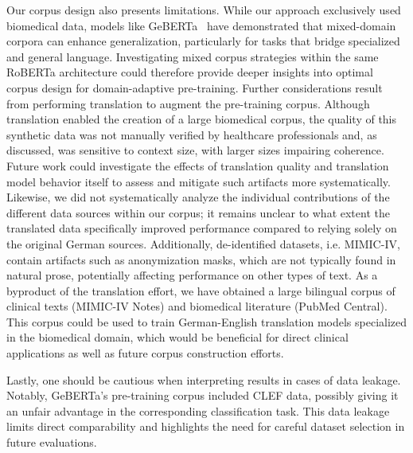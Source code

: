 Our corpus design also presents limitations. While our approach exclusively used
biomedical data, models like GeBERTa~\cite{dada2023impact} have demonstrated
that mixed-domain corpora can enhance generalization, particularly for tasks
that bridge specialized and general language. Investigating mixed corpus
strategies within the same RoBERTa architecture could therefore provide deeper
insights into optimal corpus design for domain-adaptive pre-training. Further
considerations result from performing translation to augment the pre-training
corpus. Although translation enabled the creation of a large biomedical corpus,
the quality of this synthetic data was not manually verified by healthcare
professionals and, as discussed, was sensitive to context size, with larger
sizes impairing coherence. Future work could investigate the effects of
translation quality and translation model behavior itself to assess and mitigate
such artifacts more systematically. Likewise, we did not systematically analyze
the individual contributions of the different data sources within our corpus; it
remains unclear to what extent the translated data specifically improved
performance compared to relying solely on the original German sources.
Additionally, de-identified datasets, i.e. MIMIC-IV, contain artifacts such as
anonymization masks, which are not typically found in natural prose, potentially
affecting performance on other types of text. As a byproduct of the translation
effort, we have obtained a large bilingual corpus of clinical texts (MIMIC-IV
Notes) and biomedical literature (PubMed Central). This corpus could be used to
train German-English translation models specialized in the biomedical domain,
which would be beneficial for direct clinical applications as well as future
corpus construction efforts. 

Lastly, one should be cautious when interpreting results in cases of data
leakage. Notably, GeBERTa’s pre-training corpus included CLEF data, possibly
giving it an unfair advantage in the corresponding classification task. This
data leakage limits direct comparability and highlights the need for careful
dataset selection in future evaluations.
